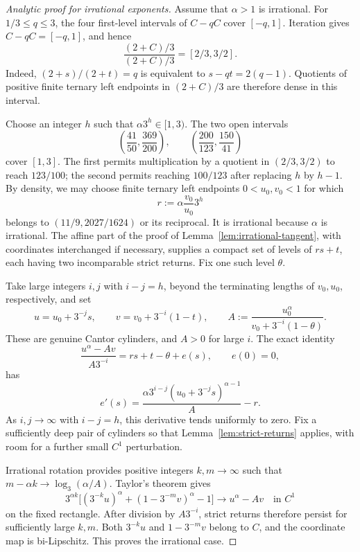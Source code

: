 \documentclass[11pt,a4paper]{amsart}
\numberwithin{equation}{section}
\theoremstyle{definition}
\begin{document}
\begin{proof}[Analytic proof for irrational exponents]
Assume that \(\alpha>1\) is irrational.
For \(1/3\leq q\leq3\), the four first-level intervals of
\(C-qC\) cover \([-q,1]\). Iteration gives \(C-qC=[-q,1]\), and hence
\[
\frac{(2+C)/3}{(2+C)/3}=[2/3,3/2].
\]
Indeed, \((2+s)/(2+t)=q\) is equivalent to
\(s-qt=2(q-1)\). Quotients of positive finite ternary left endpoints
in \((2+C)/3\) are therefore dense in this interval.

Choose an integer \(h\) such that \(\alpha3^h\in[1,3)\).
The two open intervals
\[
\left(\frac{41}{50},\frac{369}{200}\right),\qquad
\left(\frac{200}{123},\frac{150}{41}\right)
\]
cover \([1,3]\). The first permits multiplication by a quotient
in \((2/3,3/2)\) to reach \(123/100\); the second permits reaching
\(100/123\) after replacing \(h\) by \(h-1\).
By density, we may choose finite ternary left endpoints
\(0<u_0,v_0<1\) for which
\[
r:=\alpha\frac{v_0}{u_0}3^h
\]
belongs to \((11/9,2027/1624)\) or its reciprocal.
It is irrational because \(\alpha\) is irrational.
The affine part of the proof of Lemma~\ref{lem:irrational-tangent},
with coordinates interchanged if necessary, supplies a compact set
of levels of \(rs+t\), each having two incomparable strict returns.
Fix one such level \(\theta\).

Take large integers \(i,j\) with \(i-j=h\), beyond the terminating
lengths of \(v_0,u_0\), respectively, and set
\[
u=u_0+3^{-j}s,\qquad v=v_0+3^{-i}(1-t),\qquad
A:=\frac{u_0^\alpha}{v_0+3^{-i}(1-\theta)}.
\]
These are genuine Cantor cylinders, and \(A>0\) for large \(i\).
The exact identity
\[
\frac{u^\alpha-Av}{A3^{-i}}=rs+t-\theta+e(s),\qquad e(0)=0,
\]
has
\[
e'(s)=\frac{\alpha3^{i-j}(u_0+3^{-j}s)^{\alpha-1}}A-r.
\]
As \(i,j\to\infty\) with \(i-j=h\), this derivative tends uniformly
to zero. Fix a sufficiently deep pair of cylinders so that
Lemma~\ref{lem:strict-returns} applies, with room for a further
small \(C^1\) perturbation.

Irrational rotation provides positive integers \(k,m\to\infty\)
such that \(m-\alpha k\to\log_3(\alpha/A)\). Taylor's theorem gives
\[
3^{\alpha k}\bigl[(3^{-k}u)^\alpha+(1-3^{-m}v)^\alpha-1\bigr]
\longrightarrow u^\alpha-Av
\quad\text{in }C^1
\]
on the fixed rectangle. After division by \(A3^{-i}\), strict
returns therefore persist for sufficiently large \(k,m\).
Both \(3^{-k}u\) and \(1-3^{-m}v\) belong to \(C\), and the
coordinate map is bi-Lipschitz. This proves the irrational case.
\end{proof}
\end{document}
